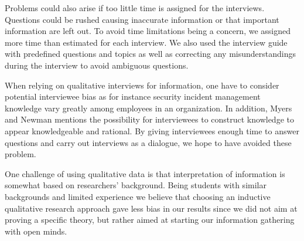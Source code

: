 Problems could also arise if too little time is assigned for the interviews. Questions could be rushed causing inaccurate information or that important information are left out. To avoid time limitations being a concern, we assigned more time than estimated for each interview. We also used the interview guide with predefined questions and topics as well as correcting any misunderstandings during the interview to avoid ambiguous questions.

When relying on qualitative interviews for information, one have to consider potential interviewee bias as for instance security incident management knowledge vary greatly among employees in an organization. In addition, Myers and Newman mentions the possibility for interviewees to construct knowledge to appear knowledgeable and rational. By giving interviewees enough time to answer questions and carry out interviews as a dialogue, we hope to have avoided these problem.

One challenge of using qualitative data is that interpretation of information is somewhat based on researchers' background. Being students with similar backgrounds and limited experience we believe that choosing an inductive qualitative research approach gave less bias in our results since we did not aim at proving a specific theory, but rather aimed at starting our information gathering with open minds. 



